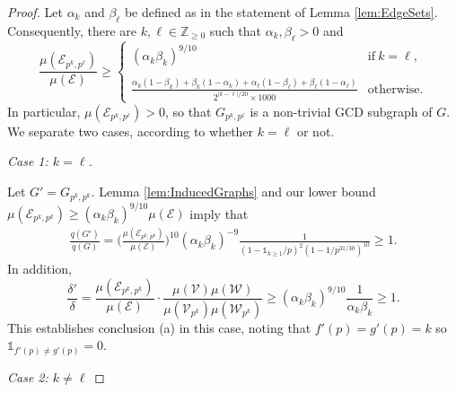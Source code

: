 \documentclass[12pt]{amsart}
\numberwithin{equation}{section}
\theoremstyle{definition}
\theoremstyle{remark}
\newcommand{\Z}{\mathbb{Z}}
\newcommand{\CE}{\mathcal{E}}
\newcommand{\CV}{\mathcal{V}}
\newcommand{\CW}{\mathcal{W}}
\newcommand{\ds}{\displaystyle}
\newcommand{\als}[1]{\begin{align*} #1 \end{align*} }
\newcommand{\un}{\mathds{1}}
\renewcommand{\ge}{\geqslant}
\begin{document}
\begin{proof} Let $\alpha_k$ and $\beta_\ell$ be defined as in the statement of Lemma \ref{lem:EdgeSets}. Consequently, there are $k,\ell\in\Z_{\ge0}$ such that $\alpha_k,\beta_\ell>0$ and
\begin{equation}\label{eq:FirstPigeonholeArgument}
\frac{\mu(\CE_{p^k,p^\ell})}{\mu(\CE)} 	
\ge 	
\begin{cases}
(\alpha_{k}\beta_{k})^{9/10}
&\text{if}\ k=\ell,\\
\\
\ds\frac{\alpha_k(1-\beta_k)
	+\beta_k(1-\alpha_k)
	+\alpha_\ell(1-\beta_\ell)
	+\beta_\ell(1-\alpha_\ell)}{2^{|k-\ell|/20}\times 1000}
&\text{otherwise}.
\end{cases}
\end{equation}
In particular, $\mu(\CE_{p^k,p^\ell})>0$, so that $G_{p^k,p^\ell}$ is a non-trivial GCD subgraph of $G$. We separate two cases, according to whether $k=\ell$ or not.

\bigskip

\noindent 
\textit{Case 1: $k=\ell$.}

\medskip

Let $G'=G_{p^k,p^k}$. Lemma \ref{lem:InducedGraphs} and our lower bound $\mu(\CE_{p^k,p^k})\ge (\alpha_k\beta_k)^{9/10}\mu(\CE)$ imply that
\als{
\frac{q(G')}{q(G)}	=\bigg(\frac{\mu(\CE_{p^k,p^k})}{\mu(\CE)}\bigg)^{10}
	(\alpha_k\beta_k)^{-9}
	\frac{1}{(1-\un_{k\ge1}/p)^2(1-1/p^{31/30})^{10}} \ge1.
}
In addition,
\[
\frac{\delta'}{\delta} 
	= \frac{\mu(\CE_{p^k,p^k})}{\mu(\CE)} \cdot
	 \frac{\mu(\CV)\mu(\CW)}{\mu(\CV_{p^k})\mu(\CW_{p^k})}  
	\ge (\alpha_{k}\beta_{k})^{9/10}\frac{1}{\alpha_k\beta_k} \ge 1.
\]
This establishes conclusion  (a) in this case, noting that $f'(p)=g'(p)=k$ so $\un_{f'(p)\ne g'(p)}=0$.


\bigskip

\noindent 
\textit{Case 2: $k\ne \ell$}

\medskip


\end{proof}
\end{document}
